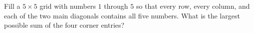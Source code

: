Fill a $5\times5$ grid with numbers $1$ through $5$ so that every row, every column, and each of the two main diagonals contains all five numbers. What is the largest possible sum of the four corner entries?
